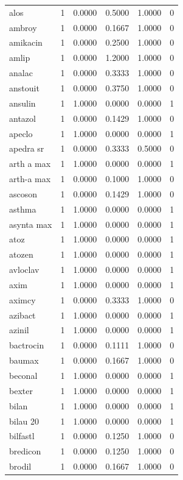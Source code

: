 \begin{longtable}{p{3.0cm}rrrrr}
alos & 1 & 0.0000 & 0.5000 & 1.0000 & 0 \\
ambroy & 1 & 0.0000 & 0.1667 & 1.0000 & 0 \\
amikacin & 1 & 0.0000 & 0.2500 & 1.0000 & 0 \\
amlip & 1 & 0.0000 & 1.2000 & 1.0000 & 0 \\
analac & 1 & 0.0000 & 0.3333 & 1.0000 & 0 \\
anstouit & 1 & 0.0000 & 0.3750 & 1.0000 & 0 \\
ansulin & 1 & 1.0000 & 0.0000 & 0.0000 & 1 \\
antazol & 1 & 0.0000 & 0.1429 & 1.0000 & 0 \\
apeclo & 1 & 1.0000 & 0.0000 & 0.0000 & 1 \\
apedra sr & 1 & 0.0000 & 0.3333 & 0.5000 & 0 \\
arth a max & 1 & 1.0000 & 0.0000 & 0.0000 & 1 \\
arth-a max & 1 & 0.0000 & 0.1000 & 1.0000 & 0 \\
ascoson & 1 & 0.0000 & 0.1429 & 1.0000 & 0 \\
asthma & 1 & 1.0000 & 0.0000 & 0.0000 & 1 \\
asynta max & 1 & 1.0000 & 0.0000 & 0.0000 & 1 \\
atoz & 1 & 1.0000 & 0.0000 & 0.0000 & 1 \\
atozen & 1 & 1.0000 & 0.0000 & 0.0000 & 1 \\
avloclav & 1 & 1.0000 & 0.0000 & 0.0000 & 1 \\
axim & 1 & 1.0000 & 0.0000 & 0.0000 & 1 \\
aximcy & 1 & 0.0000 & 0.3333 & 1.0000 & 0 \\
azibact & 1 & 1.0000 & 0.0000 & 0.0000 & 1 \\
azinil & 1 & 1.0000 & 0.0000 & 0.0000 & 1 \\
bactrocin & 1 & 0.0000 & 0.1111 & 1.0000 & 0 \\
baumax & 1 & 0.0000 & 0.1667 & 1.0000 & 0 \\
beconal & 1 & 1.0000 & 0.0000 & 0.0000 & 1 \\
bexter & 1 & 1.0000 & 0.0000 & 0.0000 & 1 \\
bilan & 1 & 1.0000 & 0.0000 & 0.0000 & 1 \\
bilau 20 & 1 & 1.0000 & 0.0000 & 0.0000 & 1 \\
bilfastl & 1 & 0.0000 & 0.1250 & 1.0000 & 0 \\
bredicon & 1 & 0.0000 & 0.1250 & 1.0000 & 0 \\
brodil & 1 & 0.0000 & 0.1667 & 1.0000 & 0 \\

\end{longtable}
